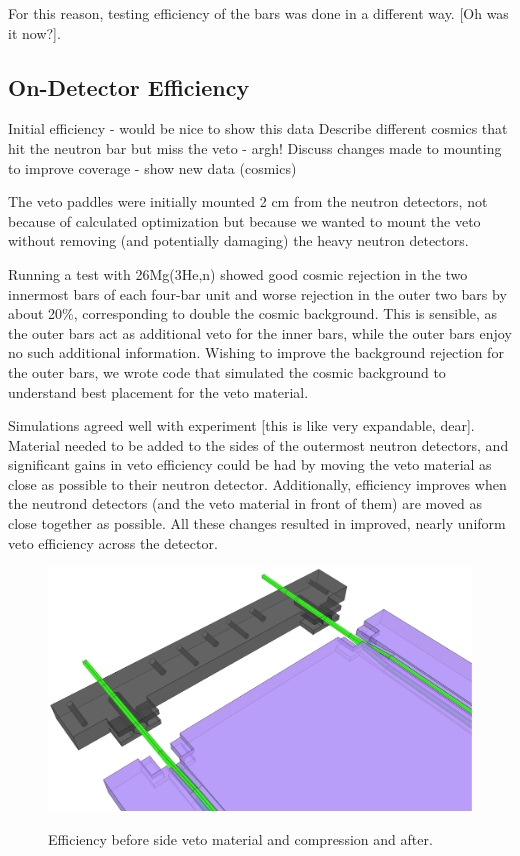 For this reason, testing efficiency of the bars was done in a different way.  [Oh was it now?].

\subsection{On-Detector Efficiency}
Initial efficiency - would be nice to show this data
Describe different cosmics that hit the neutron bar but miss the veto - argh!
Discuss changes made to mounting to improve coverage - show new data (cosmics)

The veto paddles were initially mounted 2 cm from the neutron detectors, not because of calculated optimization but because we wanted to mount the veto without removing (and potentially damaging) the heavy neutron detectors.

Running a test with 26Mg(3He,n) showed good cosmic rejection in the two innermost bars of each four-bar unit and worse rejection in the outer two bars by about 20\%, corresponding to double the cosmic background.  This is sensible, as the outer bars act as additional veto for the inner bars, while the outer bars enjoy no such additional information.  Wishing to improve the background rejection for the outer bars, we wrote code that simulated the cosmic background to understand best placement for the veto material.

Simulations agreed well with experiment [this is like very expandable, dear].  Material needed to be added to the sides of the outermost neutron detectors, and significant gains in veto efficiency could be had by moving the veto material as close as possible to their neutron detector.  Additionally, efficiency improves when the neutrond detectors (and the veto material in front of them) are moved as close together as possible.  All these changes resulted in improved, nearly uniform veto efficiency across the detector.

\begin{figure}[ht]
\centering
\includegraphics[width=1.0\textwidth]{figures/veto_assembly.eps}
\label{fig:compareEfficiency}
\caption{Efficiency before side veto material and compression and after.}
\end{figure}

